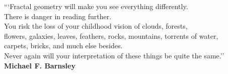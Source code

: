 
\pretextualchapter{}
\vspace{8cm}
\begin{flushright}
\textnormal{```Fractal geometry will make you see everything differently. \\
	 There is danger in reading further. \\
	 You risk the loss of your childhood vision of clouds, forests,\\
	 flowers, galaxies, leaves, feathers, rocks, mountains, torrents of water,\\
	 carpets, bricks, and much else besides.\\
	 Never again will your interpretation of these things be quite the same.'' \\
	\bfseries Michael F. Barnsley}
\end{flushright}

